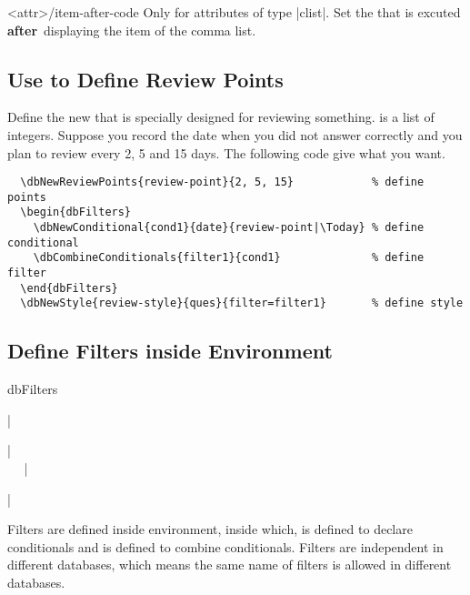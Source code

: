 \documentclass[full]{l3doc}
\def\enafter{\textbf{after}~}
\begin{document}
\begin{documentation}
\begin{option}[added=2022-01-05, rEXP]{<attr>/item-after-code}
  Only for attributes of type |clist|. Set the  that is excuted
  \enafter displaying the item of the comma list.
\end{option}

\subsection{Use  to Define Review Points}

\begin{function}[added=2022-01-05]{\dbNewReviewPoints}
  \begin{syntax}
      
  \end{syntax}

  Define the new  that is specially designed for reviewing
  something.  is a list of integers. Suppose you record the date
  when you did not answer correctly and you plan to review every 2, 5 and 15
  days. The following code give what you want.
\end{function}

\begin{verbatim}
  \dbNewReviewPoints{review-point}{2, 5, 15}            % define points
  \begin{dbFilters}
    \dbNewConditional{cond1}{date}{review-point|\Today} % define conditional
    \dbCombineConditionals{filter1}{cond1}              % define filter
  \end{dbFilters}
  \dbNewStyle{review-style}{ques}{filter=filter1}       % define style
\end{verbatim}

\subsection{Define Filters inside  Environment}

\begin{environment}[added=2022-01-05]{dbFilters}
  \begin{syntax}
    |\begin{dbFilters}| \\
    ~~
    |\end{dbFilters}| \\
  \end{syntax}

  Filters are defined inside  environment, inside which,
   is defined to declare conditionals and
   is defined to combine conditionals. Filters are
  independent in different databases, which means the same name of filters is
  allowed in different databases.
\end{environment}


\end{documentation}
\end{document}
